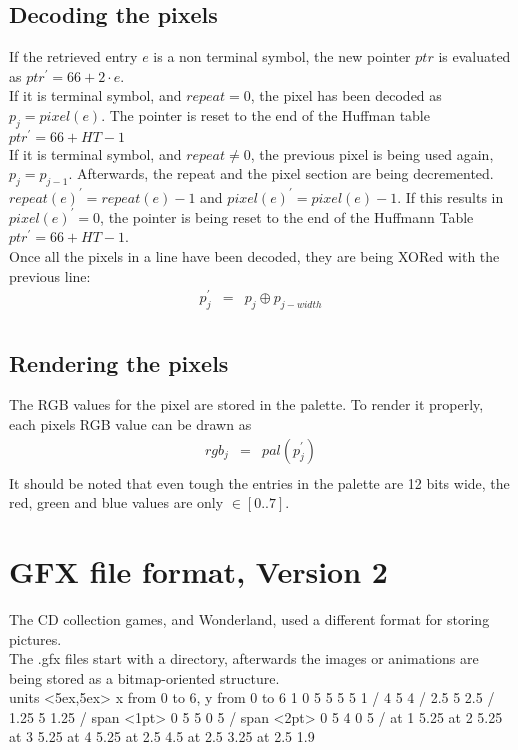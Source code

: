 \documentclass[11pt,twoside,openright]{report}
\begin{document}
\subsection{Decoding the pixels}
If the retrieved entry $e$ is a non terminal symbol, the new pointer $ptr$ is evaluated as $ptr^\prime=66+2\cdot e$.\\
If it is terminal symbol, and $repeat=0$, the pixel has been decoded as $p_j=pixel(e)$. The pointer is reset to the end of the Huffman table $ptr^\prime=66+HT-1$\\
If it is terminal symbol, and $repeat\ne 0$, the previous pixel is being used again, $p_j=p_{j-1}$. Afterwards, the repeat and the pixel section are being decremented. $repeat(e)^\prime=repeat(e)-1$ and $pixel(e)^\prime=pixel(e)-1$. If this results in $pixel(e)^\prime=0$, the pointer is being reset to the end of the Huffmann Table $ptr^\prime=66+HT-1$.\\

Once all the pixels in a line have been decoded, they are being XORed with the previous line:
\begin{eqnarray*}
p_j^\prime&=&p_j\oplus p_{j-width}\\
\end{eqnarray*}
\subsection{Rendering the pixels}
The RGB values for the pixel are stored in the palette. To render it properly, each pixels RGB value can be drawn as 
\begin{eqnarray*}
rgb_j&=&pal(p_j^\prime)\\
\end{eqnarray*}
It should be noted that even tough the entries in the palette are 12 bits wide, the red, green and blue values are only $\in\left[0..7\right]$.\\
\section{GFX file format, Version 2}
The CD collection games, and Wonderland, used a different format for storing pictures.\\
The .gfx files start with a directory, afterwards the images or animations are being stored as a bitmap-oriented structure.\\

\beginpicture
\setcoordinatesystem units <5ex,5ex>
\setplotarea x from 0 to 6, y from 0 to 6
 1 0 5 5 5 5 1 /
 4 5 4 /
 2.5 5 2.5 /
 1.25 5 1.25 /
\setshadegrid span <1pt>
 0 5 5 0 5 /
\setshadegrid span <2pt>
 0 5 4 0 5 /
 at 1 5.25
 at 2 5.25
 at 3 5.25
 at 4 5.25
 at 2.5 4.5
 at 2.5 3.25
 at 2.5 1.9
\end{document}
